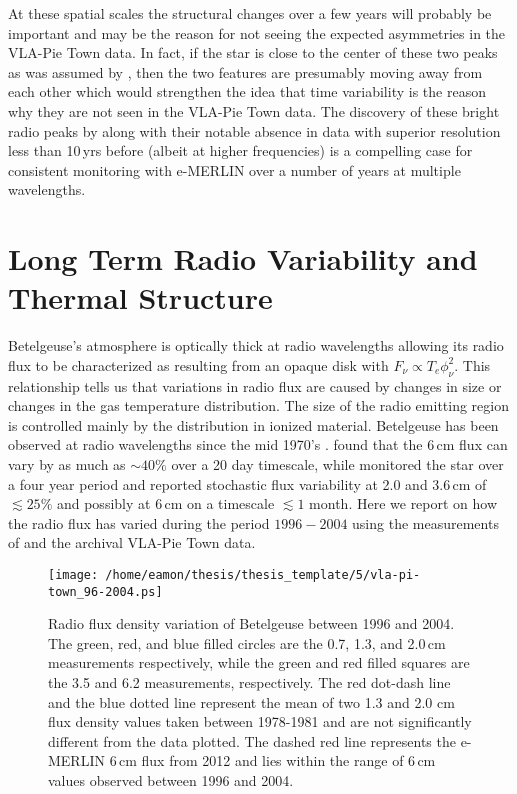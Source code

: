 At these spatial scales the structural changes over a few years will probably be important and may be the reason for not seeing the expected asymmetries in the VLA-Pie Town data. In fact, if the star is close to the center of these two peaks as was assumed by \cite{richards_2013}, then the two features are presumably moving away from each other which would strengthen the idea that time variability is the reason why they are not seen in the VLA-Pie Town data. The discovery of these bright radio peaks by \cite{richards_2013} along with their notable absence in data with superior resolution less than 10\,yrs before (albeit at higher frequencies) is a compelling case for consistent monitoring with e-MERLIN over a number of years at multiple wavelengths.

\section{Long Term Radio Variability and Thermal Structure}\label{sec:5.14}
Betelgeuse's atmosphere is optically thick at radio wavelengths allowing its radio flux to be characterized as resulting from an opaque disk with $F_{\nu} \propto T_{e}\phi _{\nu}^2$. This relationship tells us that variations in radio flux are caused by changes in size or changes in the gas temperature distribution. The size of the radio emitting region is controlled mainly by the distribution in ionized material. Betelgeuse has been observed at radio wavelengths since the mid 1970's \cite[e.g.][]{newell_1982}. \cite{bookbinder_1987} found that the 6\,cm flux can vary by as much as $\sim 40\%$ over a 20 day timescale, while \cite{drake_1992} monitored the star over a four year period and reported stochastic flux variability at 2.0 and 3.6\,cm of $\lesssim 25\%$ and possibly at 6\,cm on a timescale $\lesssim 1$ month. Here we report on how the radio flux has varied during the period $1996-2004$ using the measurements of \cite{lim_1998} and the archival VLA-Pie Town data.

\begin{figure}[hbt!]
\centering
          \texttt{[image: /home/eamon/thesis/thesis\_template/5/vla-pi-town\_96-2004.ps]}
\caption[Radio flux density variation of Betelgeuse between $1996\rightarrow 2004$]{Radio flux density variation of Betelgeuse between 1996 and 2004. The green, red, and blue filled circles are the 0.7, 1.3, and 2.0\,cm measurements respectively, while the green and red filled squares are the 3.5 and 6.2 measurements, respectively. The red dot-dash line and the blue dotted line represent the mean of two 1.3 and 2.0 cm flux density values taken between 1978-1981 and are not significantly different from the data plotted. The dashed red line represents the e-MERLIN 6\,cm flux from 2012 and lies within the range of 6\,cm values observed between 1996 and 2004.}
\label{fig:5.16}
\end{figure}

